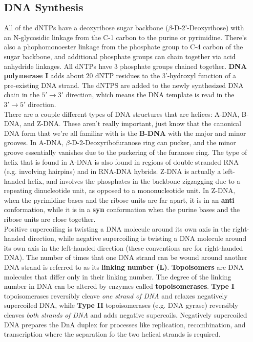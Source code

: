 \documentclass{article}
\theoremstyle{plain}%
\theoremstyle{definition}
\theoremstyle{remark}
\begin{document}
\subsection{DNA Synthesis}
All of the dNTPs have a deoxyribose sugar backbone ($\beta$-D-2'-Deoxyribose) with an N-glycosidic linkage from the C-1 carbon to the purine or pyrimidine. There's also a phophomonoester linkage from the phosphate group to C-4 carbon of the sugar backbone, and additional phosphate groups can chain together via acid anhydride linkages. All dNTPs have 3 phosphate groups chained together. \textbf{DNA polymerase I} adds about 20 dNTP residues to the 3'-hydroxyl function of a pre-existing DNA strand. The dNTPS are added to the newly synthesized DNA chain in the $5'\rightarrow3'$ direction, which means the DNA template is read in the $3'\rightarrow5'$ direction. \\
\indent There are a couple different types of DNA structures that are helices: A-DNA, B-DNA, and Z-DNA. These aren't really important, just know that the canonical DNA form that we're all familiar with is the \textbf{B-DNA} with the major and minor grooves. In A-DNA, $\beta$-D-2-Deoxyribofuranose ring can pucker, and the minor groove essentially vanishes due to the puckering of the furanose ring. The type of helix that is found in A-DNA is also found in regions of double stranded RNA (e.g. involving hairpins) and in RNA-DNA hybrids. Z-DNA is actually a left-handed helix, and involves the phosphates in the backbone zigzagging due to a repeating dinucleotide unit, as opposed to a mononucleotide unit. In Z-DNA, when the pyrimidine bases and the ribose units are far apart, it is in an \textbf{anti} conformation, while it is in a \textbf{syn} conformation when the purine bases and the ribose units are close together.\\
\indent Positive supercoiling is twisting a DNA molecule around its own axis in the right-handed direction, while negative supercoiling is twisting a DNA molecule around its own axis in the left-handed direction (these conventions are for right-handed DNA). The number of times that one DNA strand can be wound around another DNA strand is referred to as its \textbf{linking number (L)}. \textbf{Topoisomers} are DNA molecules that differ only in their linking number. The degree of the linking number in DNA can be altered by enzymes called \textbf{topoisomerases}. \textbf{Type I} topoisomerases reversibly cleave \textit{one strand of DNA} and relaxes negatively supercoiled DNA, while \textbf{Type II} topoisomerases (e.g. DNA gyrase) reversibly cleaves \textit{both strands of DNA} and adds negative supercoils. Negatively supercoiled DNA prepares the DnA duplex for processes like replication, recombination, and transcription where the separation fo the two helical strands is required. \\
\end{document}

